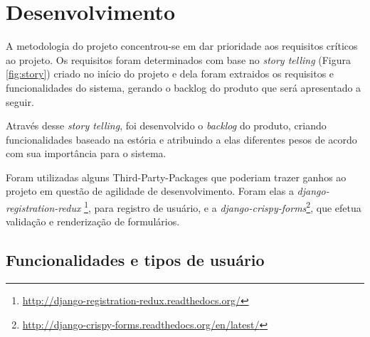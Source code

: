 \documentclass[tg]{mdtufsm}
\begin{document}
\fi

\chapter{Desenvolvimento}


A metodologia do projeto concentrou-se em dar prioridade aos requisitos críticos ao projeto. Os requisitos foram determinados com base no \emph{story telling} (Figura \ref{fig:story}) criado no início do projeto e dela foram extraidos os requisitos e funcionalidades do sistema, gerando o backlog do produto que será apresentado a seguir.

Através desse \emph{story telling}, foi desenvolvido o \emph{backlog} do produto, criando funcionalidades baseado na estória e atribuindo a elas diferentes pesos de acordo com sua importância para o sistema.

Foram utilizadas alguns Third-Party-Packages que poderiam trazer ganhos ao projeto em questão de agilidade de desenvolvimento. Foram elas a \emph{django-registration-redux} \footnote{\url{http://django-registration-redux.readthedocs.org/}}, para registro de usuário, e a \emph{django-crispy-forms}\footnote{\url{http://django-crispy-forms.readthedocs.org/en/latest/}}, que efetua validação e renderização de formulários.

\section{Funcionalidades e tipos de usuário}
\end{document}
